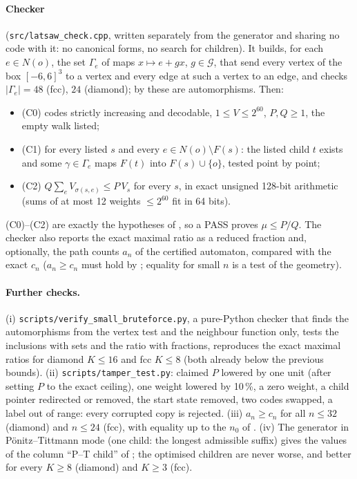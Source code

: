 \documentclass[11pt,a4paper]{report}
\begin{document}
\paragraph{Checker} (\texttt{src/latsaw\_check.cpp}, written separately from the generator and sharing no code with it:
no canonical forms, no search for children). It builds, for each \(e\in N(o)\), the set \(\Gamma_e\) of maps
\(x\mapsto e+gx\), \(g\in\mathcal G\), that send every vertex of the box \([-6,6]^3\) to a vertex and every edge at such a
vertex to an edge, and checks \(|\Gamma_e|=48\) (fcc), \(24\) (diamond); by  these are automorphisms. Then:
\begin{itemize}
\item (C0) codes strictly increasing and decodable, \(1\le V\le2^{60}\), \(P,Q\ge1\), the empty walk listed;
\item (C1) for every listed \(s\) and every \(e\in N(o)\setminus F(s)\): the listed child \(t\) exists and some
\(\gamma\in\Gamma_e\) maps \(F(t)\) into \(F(s)\cup\{o\}\), tested point by point;
\item (C2) \(Q\sum_eV_{\sigma(s,e)}\le P\,V_s\) for every \(s\), in exact unsigned 128-bit arithmetic (sums of at most
12 weights \(\le2^{60}\) fit in 64 bits).
\end{itemize}
(C0)--(C2) are exactly the hypotheses of , so a PASS proves \(\mu\le P/Q\). The checker also
reports the exact maximal ratio as a reduced fraction and, optionally, the path counts \(a_n\) of the certified
automaton, compared with the exact \(c_n\) (\(a_n\ge c_n\) must hold by ; equality for small \(n\) is a test
of the geometry).

\paragraph{Further checks.} (i) \texttt{scripts/verify\_small\_bruteforce.py}, a pure-Python checker that finds the
automorphisms from the vertex test and the neighbour function only, tests the inclusions with sets and the ratio with
fractions, reproduces the exact maximal ratios for diamond \(K\le16\) and fcc \(K\le8\) (both already below the
previous bounds). (ii)
\texttt{scripts/tamper\_test.py}: claimed \(P\) lowered by one unit (after setting \(P\) to the exact ceiling), one
weight lowered by 10\,\%, a zero weight, a child pointer redirected or removed, the start state removed, two codes
swapped, a label out of range: every corrupted copy is rejected. (iii) \(a_n\ge c_n\) for all \(n\le32\) (diamond) and
\(n\le24\) (fcc), with equality up to the \(n_0\) of . (iv) The generator in Pönitz--Tittmann mode (one child: the
longest admissible suffix) gives the values of the column ``P--T child'' of ; the optimised
children are never worse, and better for every \(K\ge8\) (diamond) and \(K\ge3\) (fcc).
\end{document}
